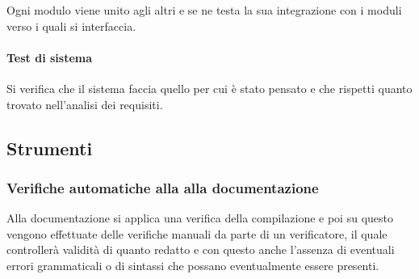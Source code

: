 Ogni modulo viene unito agli altri e se ne testa la sua integrazione con i moduli verso i quali si interfaccia.

\paragraph{Test di sistema} Si verifica che il sistema faccia quello per cui è stato pensato e che rispetti quanto trovato nell'analisi dei requisiti.

\subsection{Strumenti}

\subsubsection{Verifiche automatiche alla alla documentazione}

Alla documentazione si applica una verifica della compilazione e poi su questo vengono effettuate delle verifiche manuali da parte di un verificatore, il quale controllerà validità di quanto redatto e con questo anche l'assenza di eventuali errori grammaticali o di sintassi che possano eventualmente essere presenti.